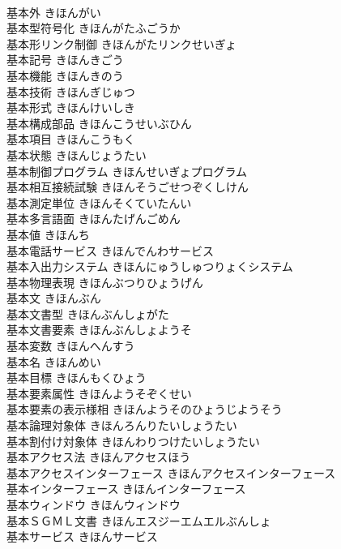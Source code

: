 \documentclass[8pt]{extreport}
\begin{document}
\begin{CJK}{UTF8}{min}
\\	基本外	きほんがい	
\\	基本型符号化	きほんがたふごうか	
\\	基本形リンク制御	きほんがたリンクせいぎょ	
\\	基本記号	きほんきごう	
\\	基本機能	きほんきのう	
\\	基本技術	きほんぎじゅつ	
\\	基本形式	きほんけいしき	
\\	基本構成部品	きほんこうせいぶひん	
\\	基本項目	きほんこうもく	
\\	基本状態	きほんじょうたい	
\\	基本制御プログラム	きほんせいぎょプログラム	
\\	基本相互接続試験	きほんそうごせつぞくしけん	
\\	基本測定単位	きほんそくていたんい	
\\	基本多言語面	きほんたげんごめん	
\\	基本値	きほんち	
\\	基本電話サービス	きほんでんわサービス	
\\	基本入出力システム	きほんにゅうしゅつりょくシステム	
\\	基本物理表現	きほんぶつりひょうげん	
\\	基本文	きほんぶん	
\\	基本文書型	きほんぶんしょがた	
\\	基本文書要素	きほんぶんしょようそ	
\\	基本変数	きほんへんすう	
\\	基本名	きほんめい	
\\	基本目標	きほんもくひょう	
\\	基本要素属性	きほんようそぞくせい	
\\	基本要素の表示様相	きほんようそのひょうじようそう	
\\	基本論理対象体	きほんろんりたいしょうたい	
\\	基本割付け対象体	きほんわりつけたいしょうたい	
\\	基本アクセス法	きほんアクセスほう	
\\	基本アクセスインターフェース	きほんアクセスインターフェース	
\\	基本インターフェース	きほんインターフェース	
\\	基本ウィンドウ	きほんウィンドウ	
\\	基本ＳＧＭＬ文書	きほんエスジーエムエルぶんしょ	
\\	基本サービス	きほんサービス	

\end{CJK}
\end{document}
